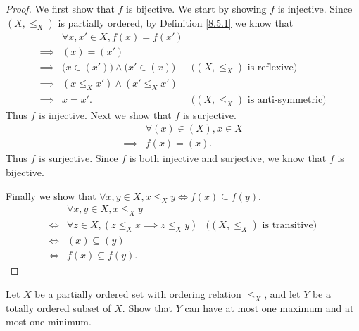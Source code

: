 \begin{proof}
    We first show that \(f\) is bijective.
    We start by showing \(f\) is injective.
    Since \((X, \leq_X)\) is partially ordered, by Definition \ref{8.5.1} we know that
    \begin{align*}
                 & \forall x, x' \in X, f(x) = f(x')                                                            \\
        \implies & (x) = (x')                                                                                   \\
        \implies & \big(x \in (x')\big) \land \big(x' \in (x)\big) & \text{(\((X, \leq_X)\) is reflexive)}      \\
        \implies & (x \leq_X x') \land (x' \leq_X x')                                                           \\
        \implies & x = x'.                                         & \text{(\((X, \leq_X)\) is anti-symmetric)}
    \end{align*}
    Thus \(f\) is injective.
    Next we show that \(f\) is surjective.
    \begin{align*}
                 & \forall (x) \in (X), x \in X \\
        \implies & f(x) = (x).
    \end{align*}
    Thus \(f\) is surjective.
    Since \(f\) is both injective and surjective, we know that \(f\) is bijective.

    Finally we show that \(\forall x, y \in X, x \leq_X y \iff f(x) \subseteq f(y)\).
    \begin{align*}
             & \forall x, y \in X, x \leq_X y                                                             \\
        \iff & \forall z \in X, (z \leq_X x \implies z \leq_X y) & \text{(\((X, \leq_X)\) is transitive)} \\
        \iff & (x) \subseteq (y)                                                                          \\
        \iff & f(x) \subseteq f(y).
    \end{align*}
\end{proof}

\begin{exercise}\label{ex 8.5.7}
    Let \(X\) be a partially ordered set with ordering relation \(\leq_X\), and let \(Y\) be a totally ordered subset of \(X\).
    Show that \(Y\) can have at most one maximum and at most one minimum.
\end{exercise}


